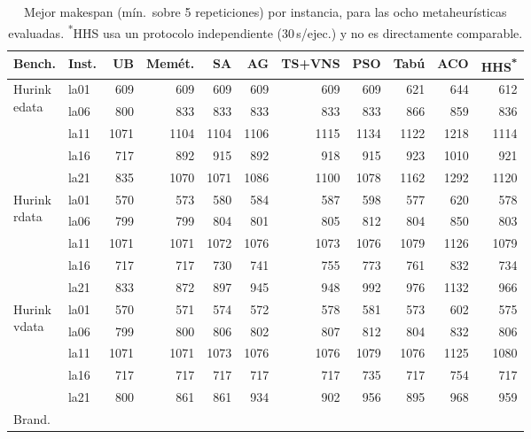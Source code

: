 \documentclass[conference]{IEEEtran}
\begin{document}
\begin{table}[tp]
\caption{Mejor makespan (m\'in.\ sobre 5 repeticiones) por
instancia, para las ocho metaheur\'isticas evaluadas.
\textsuperscript{*}HHS usa un protocolo independiente
(30\,s/ejec.) y no es directamente comparable.}
\label{tab:hhs}
\centering
\scriptsize
\setlength{\tabcolsep}{4.5pt}
\begin{tabular}{llrrrrrrrrr}
\toprule
\textbf{Bench.} & \textbf{Inst.} & \textbf{UB} & \textbf{Mem\'et.}
  & \textbf{SA} & \textbf{AG} & \textbf{TS+VNS} & \textbf{PSO}
  & \textbf{Tab\'u} & \textbf{ACO} & \textbf{HHS\textsuperscript{*}} \\
\midrule
\multirow{5}{*}{\parbox{1.1cm}{Hurink\\edata}}
  & la01 & 609  & 609 & 609 & 609 & 609 & 609 & 621 & 644 & 612 \\
  & la06 & 800  & 833 & 833 & 833 & 833 & 833 & 866 & 859 & 836 \\
  & la11 & 1071 & 1104 & 1104 & 1106 & 1115 & 1134 & 1122 & 1218 & 1114 \\
  & la16 & 717  & 892 & 915 & 892 & 918 & 915 & 923 & 1010 & 921 \\
  & la21 & 835  & 1070 & 1071 & 1086 & 1100 & 1078 & 1162 & 1292 & 1120 \\
\midrule
\multirow{5}{*}{\parbox{1.1cm}{Hurink\\rdata}}
  & la01 & 570  & 573 & 580 & 584 & 587 & 598 & 577 & 620 & 578 \\
  & la06 & 799  & 799 & 804 & 801 & 805 & 812 & 804 & 850 & 803 \\
  & la11 & 1071 & 1071 & 1072 & 1076 & 1073 & 1076 & 1079 & 1126 & 1079 \\
  & la16 & 717  & 717 & 730 & 741 & 755 & 773 & 761 & 832 & 734 \\
  & la21 & 833  & 872 & 897 & 945 & 948 & 992 & 976 & 1132 & 966 \\
\midrule
\multirow{5}{*}{\parbox{1.1cm}{Hurink\\vdata}}
  & la01 & 570  & 571 & 574 & 572 & 578 & 581 & 573 & 602 & 575 \\
  & la06 & 799  & 800 & 806 & 802 & 807 & 812 & 804 & 832 & 806 \\
  & la11 & 1071 & 1071 & 1073 & 1076 & 1076 & 1079 & 1076 & 1125 & 1080 \\
  & la16 & 717  & 717 & 717 & 717 & 717 & 735 & 717 & 754 & 717 \\
  & la21 & 800  & 861 & 861 & 934 & 902 & 956 & 895 & 968 & 959 \\
\midrule
\multirow{10}{*}{Brand.}

\end{tabular}
\end{table}
\end{document}
